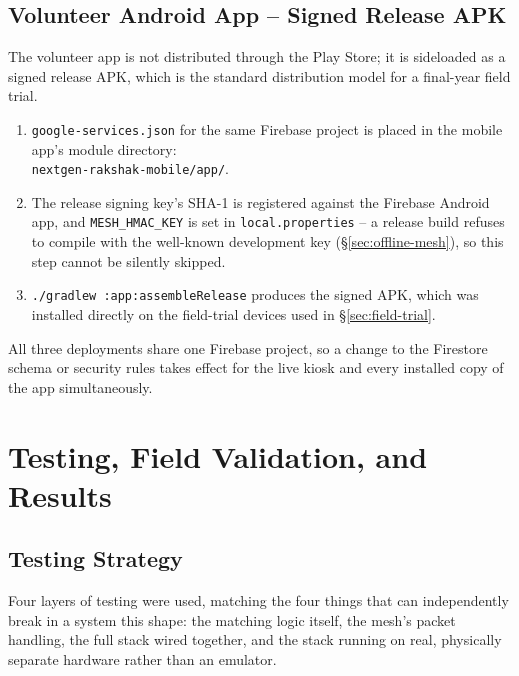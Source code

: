 \documentclass[12pt,a4paper,oneside]{report}
\newcommand{\code}[1]{\texttt{#1}}
\begin{document}
\subsection{Volunteer Android App -- Signed Release APK}

The volunteer app is not distributed through the Play Store; it is
sideloaded as a signed release APK, which is the standard distribution
model for a final-year field trial.

\begin{enumerate}
  \item \code{google-services.json} for the same Firebase project is
        placed in the mobile app's module directory: \\
        \texttt{nextgen-rakshak-mobile/app/}.
  \item The release signing key's SHA-1 is registered against the Firebase
        Android app, and \code{MESH\_HMAC\_KEY} is set in
        \texttt{local.properties} -- a release build refuses to compile
        with the well-known development key (\S\ref{sec:offline-mesh}), so this step cannot
        be silently skipped.
  \item \code{./gradlew :app:assembleRelease} produces the signed APK,
        which was installed directly on the field-trial devices used in
        \S\ref{sec:field-trial}.
\end{enumerate}

\noindent All three deployments share one Firebase project, so a change to
the Firestore schema or security rules takes effect for the live kiosk and
every installed copy of the app simultaneously.

\section{Testing, Field Validation, and Results}

\subsection{Testing Strategy}

Four layers of testing were used, matching the four things that can
independently break in a system this shape: the matching logic itself, the
mesh's packet handling, the full stack wired together, and the stack
running on real, physically separate hardware rather than an emulator.
\end{document}
